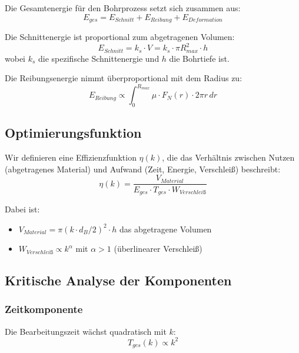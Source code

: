 ﻿\documentclass[12pt,a4paper]{article}
\begin{document}
Die Gesamtenergie für den Bohrprozess setzt sich zusammen aus:
\begin{equation}
	E_{ges} = E_{Schnitt} + E_{Reibung} + E_{Deformation}
\end{equation}

Die Schnittenergie ist proportional zum abgetragenen Volumen:
\begin{equation}
	E_{Schnitt} = k_s \cdot V = k_s \cdot \pi R_{max}^2 \cdot h
\end{equation}
wobei $k_s$ die spezifische Schnittenergie und $h$ die Bohrtiefe ist.

Die Reibungsenergie nimmt überproportional mit dem Radius zu:
\begin{equation}
	E_{Reibung} \propto \int_0^{R_{max}} \mu \cdot F_N(r) \cdot 2\pi r \, dr
\end{equation}

\subsection{Optimierungsfunktion}

Wir definieren eine Effizienzfunktion $\eta(k)$, die das Verhältnis zwischen Nutzen (abgetragenes Material) und Aufwand (Zeit, Energie, Verschleiß) beschreibt:
\begin{equation}
	\eta(k) = \frac{V_{Material}}{E_{ges} \cdot T_{ges} \cdot W_{Verschleiß}}
\end{equation}

Dabei ist:
\begin{itemize}
	\item $V_{Material} = \pi (k \cdot d_B/2)^2 \cdot h$ das abgetragene Volumen
	\item $W_{Verschleiß} \propto k^{\alpha}$ mit $\alpha > 1$ (überlinearer Verschleiß)
\end{itemize}

\subsection{Kritische Analyse der Komponenten}

\subsubsection{Zeitkomponente}

Die Bearbeitungszeit wächst quadratisch mit $k$:
\begin{equation}
	T_{ges}(k) \propto k^2
\end{equation}
\end{document}
